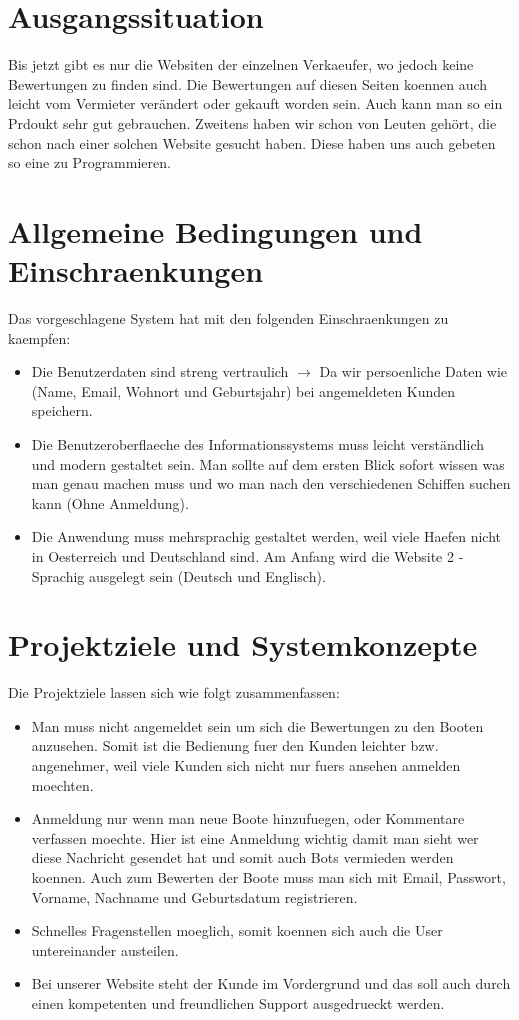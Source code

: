 \documentclass[12pt]{article}
\theoremstyle{definition}
\begin{document}
\pagebreak

\section{Ausgangssituation}
Bis jetzt gibt es nur die Websiten der einzelnen Verkaeufer, wo jedoch keine Bewertungen zu finden sind. Die Bewertungen auf diesen Seiten koennen auch leicht vom Vermieter verändert oder gekauft worden sein. Auch kann man so ein Prdoukt sehr gut gebrauchen. Zweitens haben wir schon von Leuten gehört, die schon nach einer solchen Website gesucht haben. Diese haben uns auch gebeten so eine zu Programmieren. 

\pagebreak

\section{Allgemeine Bedingungen und Einschraenkungen}

Das vorgeschlagene System hat mit den folgenden Einschraenkungen zu kaempfen:
\begin{itemize}
\item Die Benutzerdaten sind streng vertraulich $\rightarrow$ Da wir persoenliche Daten wie (Name, Email, Wohnort und Geburtsjahr) bei angemeldeten Kunden speichern.
\item Die Benutzeroberflaeche des Informationssystems muss leicht verständlich und modern gestaltet sein. Man sollte auf dem ersten Blick sofort wissen was man genau machen muss und wo man nach den verschiedenen Schiffen suchen kann (Ohne Anmeldung).
\item Die Anwendung muss mehrsprachig gestaltet werden, weil viele Haefen nicht in Oesterreich und Deutschland sind. Am Anfang wird die Website 2 - Sprachig ausgelegt sein (Deutsch und Englisch).
\end{itemize}

\pagebreak

\section{Projektziele und Systemkonzepte}
Die Projektziele lassen sich wie folgt zusammenfassen:
\begin{itemize}
\item Man muss nicht angemeldet sein um sich die Bewertungen zu den Booten anzusehen. Somit ist die Bedienung fuer den Kunden leichter bzw. angenehmer, weil viele Kunden sich nicht nur fuers ansehen anmelden moechten.
\item Anmeldung nur wenn man neue Boote hinzufuegen, oder Kommentare verfassen moechte. Hier ist eine Anmeldung wichtig damit man sieht wer diese Nachricht gesendet hat und somit auch Bots vermieden werden koennen.
Auch zum Bewerten der Boote muss man sich mit Email, Passwort, Vorname, Nachname und Geburtsdatum registrieren.
\item Schnelles Fragenstellen moeglich, somit koennen sich auch die User untereinander austeilen.
\item Bei unserer Website steht der Kunde im Vordergrund und das soll auch durch einen kompetenten und freundlichen Support ausgedrueckt werden. 
\end{itemize}
\end{document}
